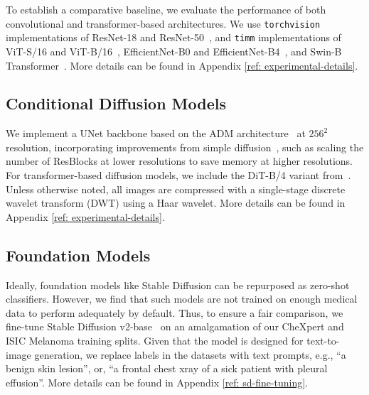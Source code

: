 To establish a comparative baseline, we evaluate the performance of both convolutional and transformer-based architectures. We use \verb|torchvision| implementations of ResNet-18 and ResNet-50~\cite{he2015deep}, and \verb|timm| implementations of ViT-S/16 and ViT-B/16~\cite{dosovitskiy2020image}, EfficientNet-B0 and EfficientNet-B4~\cite{tan2019efficientnet}, and Swin-B Transformer~\cite{liu2021swintransformer}. More details can be found in Appendix \ref{ref: experimental-details}.

\subsection{Conditional Diffusion Models}

We implement a UNet backbone based on the ADM architecture~\cite{dhariwal2021diffusionmodelsbeatgans} at $256^2$ resolution, incorporating improvements from simple diffusion~\cite{Hoogeboom:arXiv:2023:simpleDiffusion}, such as scaling the number of ResBlocks at lower resolutions to save memory at higher resolutions. For transformer-based diffusion models, we include the DiT-B/4 variant from~\cite{peebles2023scalablediffusionmodelstransformers}. Unless otherwise noted, all images are compressed with a single-stage discrete wavelet transform (DWT) using a Haar wavelet. More details can be found in Appendix \ref{ref: experimental-details}.

\subsection{Foundation Models}

Ideally, foundation models like Stable Diffusion can be repurposed as zero-shot classifiers. However, we find that such models are not trained on enough medical data to perform adequately by default. Thus, to ensure a fair comparison, we fine-tune Stable Diffusion v2-base~\cite{rombach2022highresolutionimagesynthesislatent} on an amalgamation of our CheXpert and ISIC Melanoma training splits. Given that the model is designed for text-to-image generation, we replace labels in the datasets with text prompts, e.g., ``a benign skin lesion'', or, ``a frontal chest xray of a sick patient with pleural effusion''. More details can be found in Appendix \ref{ref: sd-fine-tuning}.

